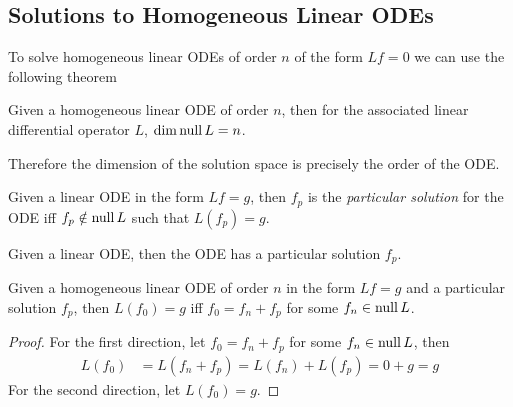 \documentclass[notes]{subfiles}
\begin{document}
\subsection{Solutions to Homogeneous Linear ODEs}
To solve homogeneous linear ODEs of order $n$ of the form $Lf = 0$ we can use the following theorem
\begin{theorem}
    Given a homogeneous linear ODE of order $n$, then for the associated linear differential operator $L$, $\dim \operatorname{null} L = n$.
\end{theorem}
Therefore the dimension of the solution space is precisely the order of the ODE.

\begin{definition}
    Given a linear ODE in the form $Lf = g$, then $f_p$ is the \textit{particular solution} for the ODE iff $f_p \notin \operatorname{null} L$ such that $L(f_p) = g$.
\end{definition}

\begin{theorem} \label{particular_solution_exists}
    Given a linear ODE, then the ODE has a particular solution $f_p$. 
\end{theorem}

\begin{lemma}
    Given a homogeneous linear ODE of order $n$ in the form $Lf = g$ and a particular solution $f_p$, then $L(f_0) = g$ iff $f_0 = f_n + f_p$ for some $f_n \in \operatorname{null} L$.
\end{lemma}
\begin{proof}
    For the first direction, let $f_0 = f_n + f_p$ for some $f_n \in \operatorname{null} L$, then
    \begin{align*}
        L(f_0)
        &= L(f_n + f_p)
        = L(f_n) + L(f_p)
        = 0 + g
        = g
    \end{align*}
    For the second direction, let $L(f_0) = g$.
\end{proof}
\end{document}
